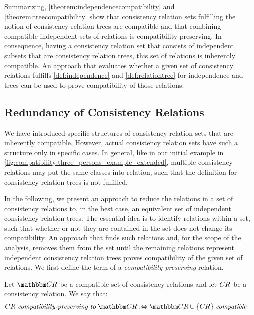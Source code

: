 Summarizing, \autoref{theorem:independencecompatibility} and \autoref{theorem:treecompatibility} show that consistency relation sets fulfilling the notion of consistency relation trees are compatible and that combining compatible independent sets of relations is compatibility-preserving.
In consequence, having a consistency relation set that consists of independent subsets that are consistency relation trees, this set of relations is inherently compatible.
An approach that evaluates whether a given set of consistency relations fulfills \autoref{def:independence} and \autoref{def:relationtree} for independence and trees can be used to prove compatibility of those relations.


\subsection{Redundancy of Consistency Relations}
\label{chap:compatibility:formal_approach:redundancy}

We have introduced specific structures of consistency relation sets that are inherently compatible.
However, actual consistency relation sets have such a structure only in specific cases.
In general, like in our initial example in \autoref{fig:compatibility:three_persons_example_extended}, multiple consistency relations may put the same classes into relation, such that the definition for consistency relation trees is not fulfilled.

In the following, we present an approach to reduce the relations in a set of consistency relations to, in the best case, an equivalent set of independent consistency relation trees.
The essential idea is to identify relations within a set, such that whether or not they are contained in the set does not change its compatibility.
An approach that finds such relations and, for the scope of the analysis, removes them from the set until the remaining relations represent independent consistency relation trees proves compatibility of the given set of relations.
We first define the term of a \emph{compatibility-preserving} relation.

\begin{definition}
    \label{def:compatibilitypreserving}
    Let $\consistencyrelationset{CR}$ be a compatible set of consistency relations and let $\consistencyrelation{CR}{}$ be a consistency relation. We say that:
    \begin{align*}
        &
        \consistencyrelation{CR}{} \compatibilitypreservingtomath \consistencyrelationset{CR} \equivalentperdefinition
        \consistencyrelationset{CR} \cup \setted{\consistencyrelation{CR}{}} \compatiblemath
    \end{align*}
\end{definition}

